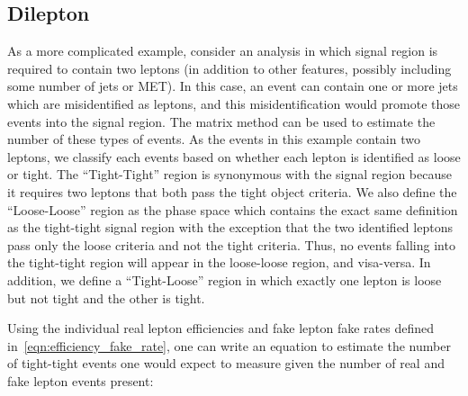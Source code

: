\subsection{Dilepton}

As a more complicated example, consider an analysis in which signal region is required to contain two leptons
(in addition to other features, possibly including some number of jets or MET).
In this case, an event can contain one or more jets which are misidentified as leptons, and this misidentification would promote those events into the signal region.
The matrix method can be used to estimate the number of these types of events.
As the events in this example contain two leptons, we classify each events based on whether each lepton
is identified as loose or tight.
The ``Tight-Tight'' region is synonymous with the signal region because it requires two leptons that both pass the tight object criteria.
We also define the ``Loose-Loose'' region as the phase space which contains the exact same definition as the tight-tight signal region with the exception that the two identified leptons pass only the loose criteria and not the tight criteria.
Thus, no events falling into the tight-tight region will appear in the loose-loose region, and visa-versa.
In addition, we define a ``Tight-Loose'' region in which exactly one lepton is loose but not tight and the other is tight.

Using the individual real lepton efficiencies and fake lepton fake rates defined in~\ref{eqn:efficiency_fake_rate},
one can write an equation to estimate the number of tight-tight events one would expect to measure given
the number of real and fake lepton events present:


